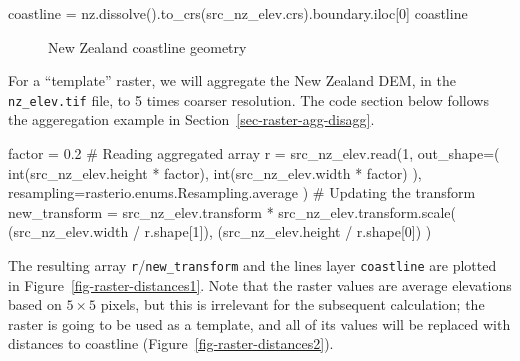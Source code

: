\documentclass[
  letterpaper,
]{krantz}
\newenvironment{Shaded}{\begin{snugshade}}{\end{snugshade}}
\newcommand{\BuiltInTok}[1]{\textcolor[rgb]{0.00,0.23,0.31}{#1}}
\newcommand{\CommentTok}[1]{\textcolor[rgb]{0.37,0.37,0.37}{#1}}
\newcommand{\DecValTok}[1]{\textcolor[rgb]{0.68,0.00,0.00}{#1}}
\newcommand{\FloatTok}[1]{\textcolor[rgb]{0.68,0.00,0.00}{#1}}
\newcommand{\NormalTok}[1]{\textcolor[rgb]{0.00,0.23,0.31}{#1}}
\newcommand{\OperatorTok}[1]{\textcolor[rgb]{0.37,0.37,0.37}{#1}}
\begin{document}
\begin{Shaded}
\begin{Highlighting}[]
\NormalTok{coastline }\OperatorTok{=}\NormalTok{ nz.dissolve().to\_crs(src\_nz\_elev.crs).boundary.iloc[}\DecValTok{0}\NormalTok{]}
\NormalTok{coastline}
\end{Highlighting}
\end{Shaded}

\begin{figure}[H]


\caption{\label{fig-nz-coastline}New Zealand coastline geometry}

\end{figure}%

For a ``template'' raster, we will aggregate the New Zealand DEM, in the
\texttt{nz\_elev.tif} file, to 5 times coarser resolution. The code
section below follows the aggeregation example in
Section~\ref{sec-raster-agg-disagg}.

\begin{Shaded}
\begin{Highlighting}[]
\NormalTok{factor }\OperatorTok{=} \FloatTok{0.2}
\CommentTok{\# Reading aggregated array}
\NormalTok{r }\OperatorTok{=}\NormalTok{ src\_nz\_elev.read(}\DecValTok{1}\NormalTok{,}
\NormalTok{    out\_shape}\OperatorTok{=}\NormalTok{(}
        \BuiltInTok{int}\NormalTok{(src\_nz\_elev.height }\OperatorTok{*}\NormalTok{ factor),}
        \BuiltInTok{int}\NormalTok{(src\_nz\_elev.width }\OperatorTok{*}\NormalTok{ factor)}
\NormalTok{        ),}
\NormalTok{    resampling}\OperatorTok{=}\NormalTok{rasterio.enums.Resampling.average}
\NormalTok{)}
\CommentTok{\# Updating the transform}
\NormalTok{new\_transform }\OperatorTok{=}\NormalTok{ src\_nz\_elev.transform }\OperatorTok{*}\NormalTok{ src\_nz\_elev.transform.scale(}
\NormalTok{    (src\_nz\_elev.width }\OperatorTok{/}\NormalTok{ r.shape[}\DecValTok{1}\NormalTok{]),}
\NormalTok{    (src\_nz\_elev.height }\OperatorTok{/}\NormalTok{ r.shape[}\DecValTok{0}\NormalTok{])}
\NormalTok{)}
\end{Highlighting}
\end{Shaded}

The resulting array \texttt{r}/\texttt{new\_transform} and the lines
layer \texttt{coastline} are plotted in
Figure~\ref{fig-raster-distances1}. Note that the raster values are
average elevations based on \(5 \times 5\) pixels, but this is
irrelevant for the subsequent calculation; the raster is going to be
used as a template, and all of its values will be replaced with
distances to coastline (Figure~\ref{fig-raster-distances2}).
\end{document}
